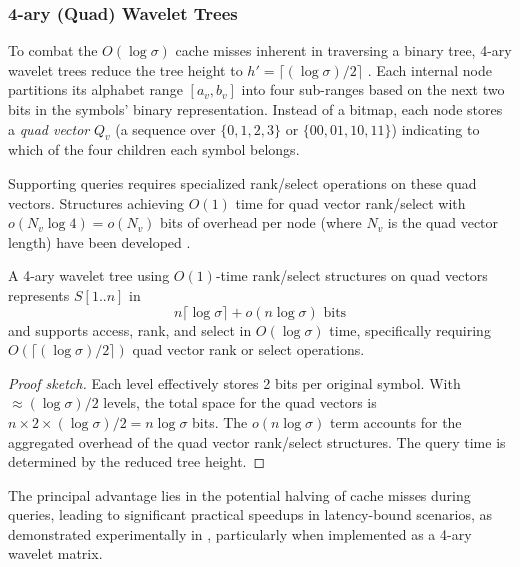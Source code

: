 \subsubsection{4-ary (Quad) Wavelet Trees}
To combat the $O(\log \sigma)$ cache misses inherent in traversing a binary tree, 4-ary wavelet trees reduce the tree height to $h' = \lceil (\log \sigma)/2 \rceil$ \cite{QWT}. Each internal node partitions its alphabet range $[a_v, b_v]$ into four sub-ranges based on the next two bits in the symbols' binary representation. Instead of a bitmap, each node stores a \emph{quad vector} $Q_v$ (a sequence over $\{0, 1, 2, 3\}$ or $\{00, 01, 10, 11\}$) indicating to which of the four children each symbol belongs.

Supporting queries requires specialized rank/select operations on these quad vectors. Structures achieving $O(1)$ time for quad vector rank/select with $o(N_v \log 4) = o(N_v)$ bits of overhead per node (where $N_v$ is the quad vector length) have been developed \cite{QWT}.

\begin{theorem} \label{thm:qwt_perf}
    A 4-ary wavelet tree using $O(1)$-time rank/select structures on quad vectors represents $S[1..n]$ in
    \[ n \lceil \log \sigma \rceil + o(n \log \sigma) \text{ bits} \]
    and supports \textsf{access}, \textsf{rank}, and \textsf{select} in $O(\log \sigma)$ time, specifically requiring $O(\lceil (\log \sigma)/2 \rceil)$ quad vector rank or select operations.
\end{theorem}
\begin{proof}[Proof sketch]
    Each level effectively stores 2 bits per original symbol. With $\approx (\log \sigma)/2$ levels, the total space for the quad vectors is $n \times 2 \times (\log \sigma)/2 = n \log \sigma$ bits. The $o(n \log \sigma)$ term accounts for the aggregated overhead of the quad vector rank/select structures. The query time is determined by the reduced tree height.
\end{proof}

The principal advantage lies in the potential halving of cache misses during queries, leading to significant practical speedups in latency-bound scenarios, as demonstrated experimentally in \cite{QWT}, particularly when implemented as a 4-ary wavelet matrix.
